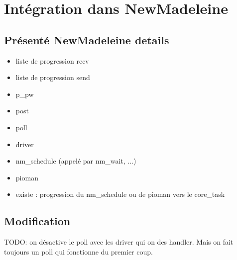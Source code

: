 \section{Intégration dans NewMadeleine}

\subsection{Présenté NewMadeleine details}

\begin{itemize}
  \item liste de progression recv
  \item liste de progression send
  \item p_pw
  \item post
  \item poll
  \item driver
  \item nm_schedule (appelé par nm_wait, ...)
  \item pioman
  \item existe : progression du nm_schedule ou de pioman vers le core_task
\end{itemize}

\subsection{Modification}

TODO: on désactive le poll avec les driver qui on des handler. Mais on fait toujours un poll qui fonctionne du premier coup.

